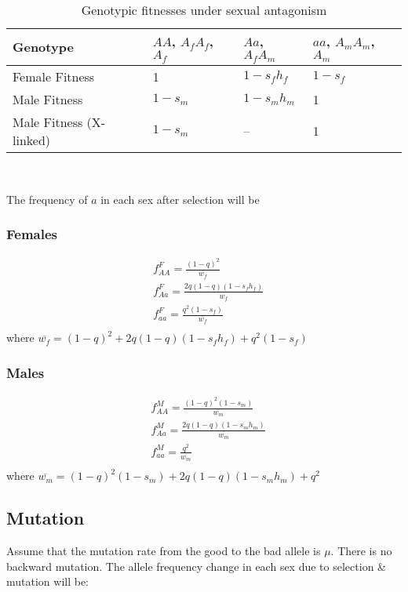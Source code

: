 \documentclass[11pt]{article}
\begin{document}
\begin{table}[h]
\caption{Genotypic fitnesses under sexual antagonism}
\label{Table:Fitness}
\centering
\begin{tabular}{l  p{3cm} p{3cm} p{3cm}} \hline
Genotype & $AA$, $A_f A_f$, $A_f$ & $Aa$, $A_f A_m$ & $aa$, $A_m A_m$, $A_m$ \\
\hline
Female Fitness & 1 & $1 - s_f h_f$ & $1 - s_f$ \\
Male Fitness & $1 - s_m$ & $1 - s_m h_m$ & 1  \\
Male Fitness (X-linked)  & $1 - s_m$ & -- & 1  \\
\hline
\end{tabular}
\bigskip{}
\\
{\footnotesize}
\end{table}

The frequency of $a$ in each sex after selection will be

\subsubsection{Females}
\begin{align*}
&f^F_{AA} = \frac{(1-q)^{2}}{\overline{w_f}} \\
&f^F_{Aa} = \frac{2q(1-q)(1-s_f h_f)}{\overline{w_f}} \\
&f^F_{aa} = \frac{q^{2}(1-s_f)}{\overline{w_f}} \\
\end{align*}
where $\overline{w_f} = (1-q)^{2} + 2q(1-q)(1-s_f h_f) + q^{2}(1-s_f)$
\bigskip

\subsubsection{Males}
\begin{align*}
&f^M_{AA} = \frac{(1-q)^{2}(1-s_m)}{\overline{w_m}} \\
&f^M_{Aa} = \frac{2q(1-q)(1-s_m h_m)}{\overline{w_m}} \\
&f^M_{aa} = \frac{q^{2}}{\overline{w_m}} \\
\end{align*}
where $\overline{w_m} = (1-q)^{2}(1-s_m) + 2q(1-q)(1-s_m h_m) + q^{2}$



\subsection{Mutation}
Assume that the mutation rate from the good to the bad allele is $\mu$. There is no backward mutation. The allele frequency change in each sex due to selection \& mutation will be:
\end{document}
